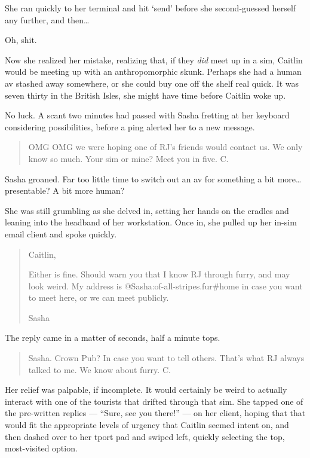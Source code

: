 She ran quickly to her terminal and hit `send' before she second-guessed herself any further, and then\ldots{}

Oh, shit.

Now she realized her mistake, realizing that, if they \emph{did} meet up in a sim, Caitlin would be meeting up with an anthropomorphic skunk. Perhaps she had a human av stashed away somewhere, or she could buy one off the shelf real quick. It was seven thirty in the British Isles, she might have time before Caitlin woke up.

No luck. A scant two minutes had passed with Sasha fretting at her keyboard considering possibilities, before a ping alerted her to a new message.

\begin{quote}
OMG OMG we were hoping one of RJ's friends would contact us. We only know so much. Your sim or mine? Meet you in five. C.
\end{quote}

Sasha groaned. Far too little time to switch out an av for something a bit more\ldots{}presentable? A bit more human?

She was still grumbling as she delved in, setting her hands on the cradles and leaning into the headband of her workstation. Once in, she pulled up her in-sim email client and spoke quickly.

\begin{quote}
Caitlin,

Either is fine. Should warn you that I know RJ through furry, and may look weird. My address is @Sasha:of-all-stripes.fur\#home in case you want to meet here, or we can meet publicly.

Sasha
\end{quote}

The reply came in a matter of seconds, half a minute tops.

\begin{quote}
Sasha. Crown Pub? In case you want to tell others. That's what RJ always talked to me. We know about furry. C.
\end{quote}

Her relief was palpable, if incomplete. It would certainly be weird to actually interact with one of the tourists that drifted through that sim. She tapped one of the pre-written replies --- ``Sure, see you there!'' --- on her client, hoping that that would fit the appropriate levels of urgency that Caitlin seemed intent on, and then dashed over to her tport pad and swiped left, quickly selecting the top, most-visited option.

